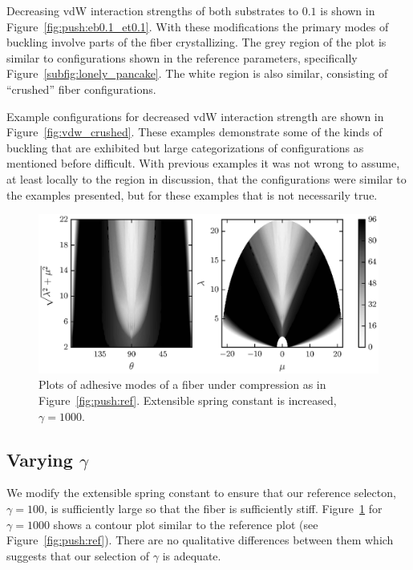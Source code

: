 Decreasing vdW interaction strengths of both substrates to $0.1$ is shown in Figure~\ref{fig:push:eb0.1_et0.1}. With these modifications the primary modes of buckling involve parts of the fiber crystallizing. The grey region of the plot is similar to configurations shown in the reference parameters, specifically Figure~\ref{subfig:lonely_pancake}. The white region is also similar, consisting of ``crushed'' fiber configurations.

Example configurations for decreased vdW interaction strength are shown in Figure~\ref{fig:vdw_crushed}. These examples demonstrate some of the kinds of buckling that are exhibited but large categorizations of configurations as mentioned before difficult. With previous examples it was not wrong to assume, at least locally to the region in discussion, that the configurations were similar to the examples presented, but for these examples that is not necessarily true.
	
	\begin{figure}[t]
		\begin{center}
			\includegraphics{./fig/ch3/push/g1000/grid.eps}
		\end{center}		
		\caption{Plots of adhesive modes of a fiber under compression as in Figure~\ref{fig:push:ref}. Extensible spring constant is increased, $\gamma=1000$.
		\label{fig:push:g1000}}
	\end{figure}	

\subsection{Varying $\gamma$}

We modify the extensible spring constant to ensure that our reference selecton, $\gamma=100$, is sufficiently large so that the fiber is sufficiently stiff. Figure~\ref{fig:push:g1000} for $\gamma=1000$ shows a contour plot similar to the reference plot (see Figure~\ref{fig:push:ref}). There are no qualitative differences between them which suggests that our selection of $\gamma$ is adequate.

